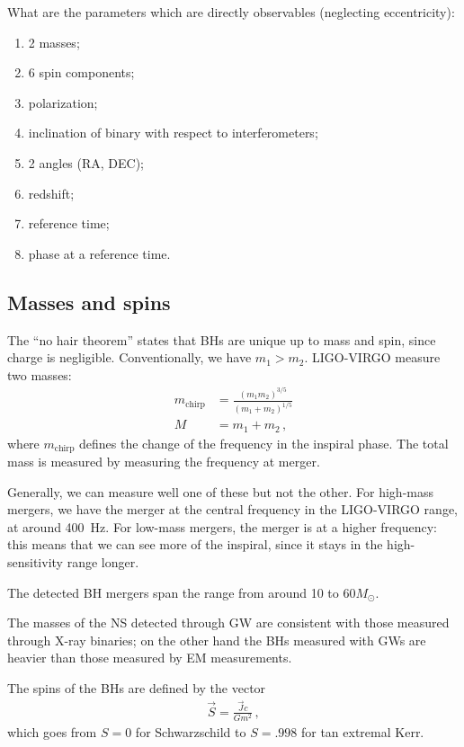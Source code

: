 \documentclass[main.tex]{subfiles}
\begin{document}
What are the parameters which are directly observables (neglecting eccentricity): 
\begin{enumerate}
  \item 2 masses;
  \item 6 spin components;
  \item polarization;
  \item inclination of binary with respect to interferometers;
  \item 2 angles (RA, DEC);
  \item redshift;
  \item reference time;
  \item phase at a reference time.
\end{enumerate}

\subsection{Masses and spins}
The ``no hair theorem'' states that BHs are unique up to mass and spin, since charge is negligible. 
Conventionally, we have \(m_1 > m_2 \). 
LIGO-VIRGO measure two masses: 
%
\begin{subequations}
\begin{align}
m _{\text{chirp}} &= \frac{(m_1 m_2 )^{3/5}}{(m_1 + m_2 )^{1/5}}  \\
M &= m_1 + m_2 
\,,
\end{align}
\end{subequations}
%
where \(m _{\text{chirp}}\) defines the change of the frequency in the inspiral phase. 
The total mass is measured by measuring the frequency at merger. 

Generally, we can measure well one of these but not the other. 
For high-mass mergers, we have the merger at the central frequency in the LIGO-VIRGO range, at around \SI{400}{Hz}. 
For low-mass mergers, the merger is at a higher frequency: this means that we can see more of the inspiral, since it stays in the high-sensitivity range longer. 

The detected BH mergers span the range from around 10 to \(60M_{\odot}\). 

The masses of the NS detected through GW are consistent with those measured through X-ray binaries; on the other hand the BHs measured with GWs are heavier than those measured by EM measurements. 

The spins of the BHs are defined by the vector 
%
\begin{align}
\vec{S} = \frac{\vec{J} c}{G m^2}
\,,
\end{align}
%
which goes from \(S = 0\) for Schwarzschild to \(S = \num{.998}\) for tan extremal Kerr. 
\end{document}
